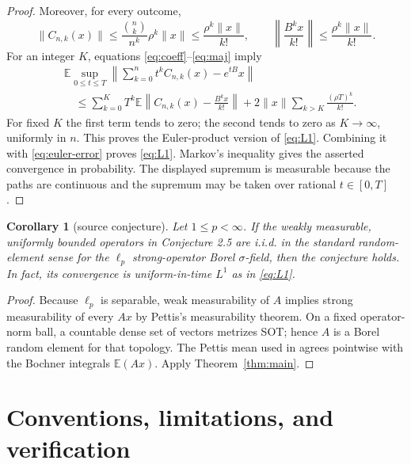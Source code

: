 \documentclass[11pt]{article}
\newtheorem{corollary}[theorem]{Corollary}
\newcommand{\E}{\mathbb E}
\begin{document}
\begin{proof}
Moreover, for every outcome,
\begin{equation}\label{eq:maj}
 \|C_{n,k}(x)\|
 \leq\frac{\binom nk}{n^k}\rho^k\|x\|
 \leq\frac{\rho^k\|x\|}{k!},
 \qquad
 \left\|\frac{B^kx}{k!}\right\|
 \leq\frac{\rho^k\|x\|}{k!}.
\end{equation}
For an integer $K$, equations \eqref{eq:coeff}--\eqref{eq:maj} imply
\begin{align*}
 &\E\sup_{0\leq t\leq T}
 \left\|\sum_{k=0}^nt^kC_{n,k}(x)-e^{tB}x\right\|\\
 &\quad\leq
 \sum_{k=0}^KT^k\E\left\|C_{n,k}(x)-\frac{B^kx}{k!}\right\|
 +2\|x\|\sum_{k>K}\frac{(\rho T)^k}{k!}.
\end{align*}
For fixed $K$ the first term tends to zero; the second tends to zero as
$K\to\infty$, uniformly in $n$.  This proves the Euler-product version of
\eqref{eq:L1}.  Combining it with \eqref{eq:euler-error} proves
\eqref{eq:L1}.  Markov's inequality gives the asserted convergence in
probability.  The displayed supremum is measurable because the paths are
continuous and the supremum may be taken over rational $t\in[0,T]$.
\end{proof}

\begin{corollary}[source conjecture]\label{cor:source}
Let $1\leq p<\infty$.  If the weakly measurable, uniformly bounded
operators in Conjecture 2.5 are i.i.d. in the standard random-element sense
for the $\ell_p$ strong-operator Borel $\sigma$-field, then the conjecture
holds.  In fact, its convergence is uniform-in-time $L^1$ as in
\eqref{eq:L1}.
\end{corollary}

\begin{proof}
Because $\ell_p$ is separable, weak measurability of $A$ implies strong
measurability of every $Ax$ by Pettis's measurability theorem.  On a fixed
operator-norm ball, a countable dense set of vectors metrizes SOT; hence $A$
is a Borel random element for that topology.  The Pettis mean used in
\cite{DS24} agrees pointwise with the Bochner integrals $\E(Ax)$.  Apply
Theorem~\ref{thm:main}.
\end{proof}

\section{Conventions, limitations, and verification}
\end{document}
